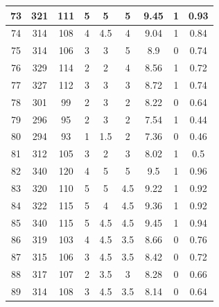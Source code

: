 \documentclass[11pt]{article}
\begin{document}
\begin{appendix}
\begin{longtable}[H]{|c|c|c|c|c|c|c|c|c|}
	73         & 321       & 111         & 5                 & 5   & 5   & 9.45 & 1        & 0.93            \\ \hline
	74         & 314       & 108         & 4                 & 4.5 & 4   & 9.04 & 1        & 0.84            \\ \hline
	75         & 314       & 106         & 3                 & 3   & 5   & 8.9  & 0        & 0.74            \\ \hline
	76         & 329       & 114         & 2                 & 2   & 4   & 8.56 & 1        & 0.72            \\ \hline
	77         & 327       & 112         & 3                 & 3   & 3   & 8.72 & 1        & 0.74            \\ \hline
	78         & 301       & 99          & 2                 & 3   & 2   & 8.22 & 0        & 0.64            \\ \hline
	79         & 296       & 95          & 2                 & 3   & 2   & 7.54 & 1        & 0.44            \\ \hline
	80         & 294       & 93          & 1                 & 1.5 & 2   & 7.36 & 0        & 0.46            \\ \hline
	81         & 312       & 105         & 3                 & 2   & 3   & 8.02 & 1        & 0.5             \\ \hline
	82         & 340       & 120         & 4                 & 5   & 5   & 9.5  & 1        & 0.96            \\ \hline
	83         & 320       & 110         & 5                 & 5   & 4.5 & 9.22 & 1        & 0.92            \\ \hline
	84         & 322       & 115         & 5                 & 4   & 4.5 & 9.36 & 1        & 0.92            \\ \hline
	85         & 340       & 115         & 5                 & 4.5 & 4.5 & 9.45 & 1        & 0.94            \\ \hline
	86         & 319       & 103         & 4                 & 4.5 & 3.5 & 8.66 & 0        & 0.76            \\ \hline
	87         & 315       & 106         & 3                 & 4.5 & 3.5 & 8.42 & 0        & 0.72            \\ \hline
	88         & 317       & 107         & 2                 & 3.5 & 3   & 8.28 & 0        & 0.66            \\ \hline
	89         & 314       & 108         & 3                 & 4.5 & 3.5 & 8.14 & 0        & 0.64            \\ \hline

\end{longtable}
\end{appendix}
\end{document}
